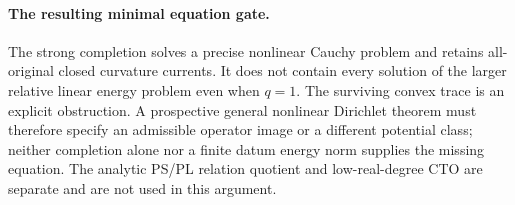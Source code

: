 \paragraph{The resulting minimal equation gate.}
The strong completion solves a precise nonlinear Cauchy problem
and retains all-original closed curvature currents.  It does
not contain every solution of the larger relative linear
energy problem even when $q=1$.  The surviving convex trace
is an explicit obstruction.  A prospective general nonlinear
Dirichlet theorem must therefore specify an admissible operator
image or a different potential class; neither completion alone
nor a finite datum energy norm supplies the missing equation.
The analytic PS/PL relation quotient and low-real-degree CTO
are separate and are not used in this argument.

